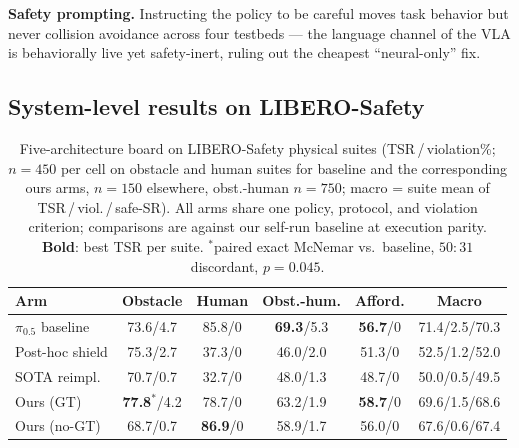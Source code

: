 \documentclass[conference]{IEEEtran}
\begin{document}
\textbf{Safety prompting.} Instructing the policy to be careful moves task behavior but never collision avoidance across four testbeds --- the language channel of the VLA is behaviorally live yet safety-inert, ruling out the cheapest ``neural-only'' fix.

\subsection{System-level results on LIBERO-Safety}
\label{sec:ls}

\begin{table}[t]
\centering
\caption{Five-architecture board on LIBERO-Safety physical suites (TSR\,/\,violation\%; $n{=}450$ per cell on obstacle and human suites for baseline and the corresponding ours arms, $n{=}150$ elsewhere, obst.-human $n{=}750$; macro = suite mean of TSR\,/\,viol.\,/\,safe-SR). All arms share one policy, protocol, and violation criterion; comparisons are against our self-run baseline at execution parity. \textbf{Bold}: best TSR per suite. $^*$paired exact McNemar vs.\ baseline, $50{:}31$ discordant, $p{=}0.045$.}
\label{tab:board}
\small
\setlength{\tabcolsep}{3pt}
\begin{tabular}{lccccc}
\toprule
Arm & Obstacle & Human & Obst.-hum. & Afford. & Macro \\
\midrule
$\pi_{0.5}$ baseline & 73.6/4.7 & 85.8/0 & \textbf{69.3}/5.3 & \textbf{56.7}/0 & 71.4/2.5/70.3 \\
Post-hoc shield & 75.3/2.7 & 37.3/0 & 46.0/2.0 & 51.3/0 & 52.5/1.2/52.0 \\
SOTA reimpl. & 70.7/0.7 & 32.7/0 & 48.0/1.3 & 48.7/0 & 50.0/0.5/49.5 \\
Ours (GT) & \textbf{77.8}$^*$/4.2 & 78.7/0 & 63.2/1.9 & \textbf{58.7}/0 & 69.6/1.5/68.6 \\
Ours (no-GT) & 68.7/0.7 & \textbf{86.9}/0 & 58.9/1.7 & 56.0/0 & 67.6/0.6/67.4 \\
\bottomrule
\end{tabular}
\end{table}
\end{document}
